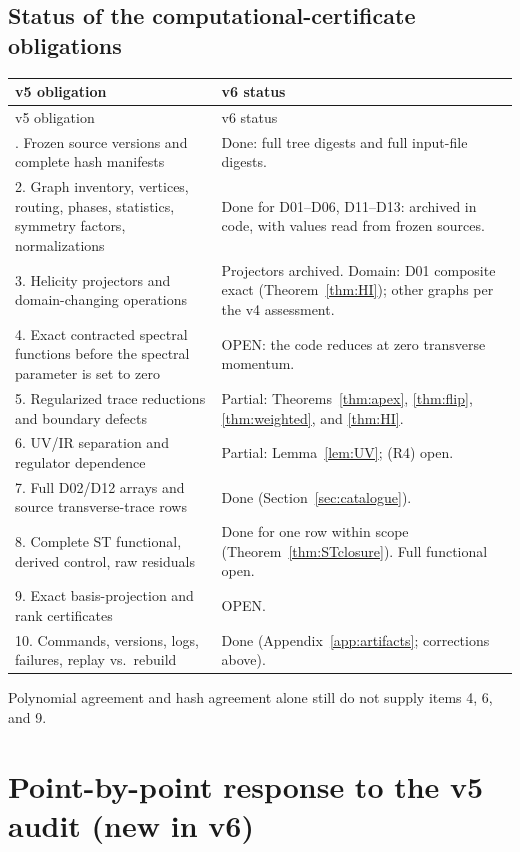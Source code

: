 \documentclass[11pt,a4paper]{article}
\newcommand{\OPEN}{\textsf{OPEN}}
\theoremstyle{plain}
\theoremstyle{definition}
\theoremstyle{remark}
\numberwithin{equation}{section}
\begin{document}
\subsection{Status of the computational-certificate obligations}

\begingroup\small
\begin{longtable}{@{}L{.44\linewidth}L{.50\linewidth}@{}}
\toprule
v5 obligation & v6 status\\
\midrule
\endfirsthead
\toprule
v5 obligation & v6 status\\
\midrule
\endhead
\bottomrule
{}. Frozen source versions and complete hash manifests &
Done: full tree digests and full input-file digests.\\
2. Graph inventory, vertices, routing, phases, statistics, symmetry
factors, normalizations &
Done for D01--D06, D11--D13: archived in code, with values read
from frozen sources.\\
3. Helicity projectors and domain-changing operations &
Projectors archived. Domain: D01 composite exact
(Theorem~\ref{thm:HI}); other graphs per the v4 assessment.\\
4. Exact contracted spectral functions before the spectral
parameter is set to zero &
\OPEN: the code reduces at zero transverse momentum.\\
5. Regularized trace reductions and boundary defects &
Partial: Theorems~\ref{thm:apex}, \ref{thm:flip},
\ref{thm:weighted}, and \ref{thm:HI}.\\
6. UV/IR separation and regulator dependence &
Partial: Lemma~\ref{lem:UV}; (R4) open.\\
7. Full D02/D12 arrays and source transverse-trace rows &
Done (Section~\ref{sec:catalogue}).\\
8. Complete ST functional, derived control, raw residuals &
Done for one row within scope (Theorem~\ref{thm:STclosure}).
Full functional open.\\
9. Exact basis-projection and rank certificates & \OPEN.\\
10. Commands, versions, logs, failures, replay vs.\ rebuild &
Done (Appendix~\ref{app:artifacts}; corrections above).\\
\end{longtable}
\endgroup
Polynomial agreement and hash agreement alone still do not supply
items 4, 6, and 9.

\section{Point-by-point response to the v5 audit (new in v6)}
\label{sec:response}
\end{document}
